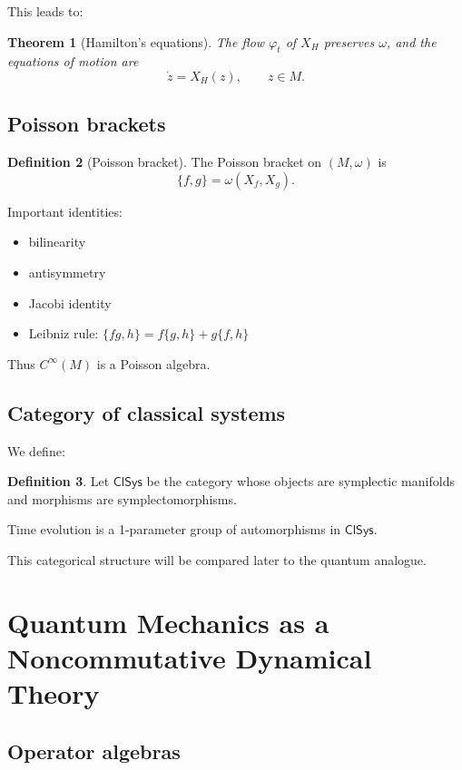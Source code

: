 \documentclass[12pt,oneside]{book}
\theoremstyle{plain}
\newtheorem{theorem}{Theorem}[chapter]
\theoremstyle{definition}
\newtheorem{definition}[theorem]{Definition}
\begin{document}
This leads to:

\begin{theorem}[Hamilton's equations]
The flow $\varphi_t$ of $X_H$ preserves $\omega$, and the equations of motion are
\[
\dot{z} = X_H(z),\qquad z\in M.
\]
\end{theorem}

\subsection{Poisson brackets}

\begin{definition}[Poisson bracket]
The Poisson bracket on $(M,\omega)$ is
\[
\{f,g\} = \omega(X_f, X_g).
\]
\end{definition}

Important identities:

\begin{itemize}
\item bilinearity
\item antisymmetry
\item Jacobi identity
\item Leibniz rule: $\{fg,h\}=f\{g,h\}+g\{f,h\}$
\end{itemize}

Thus $C^\infty(M)$ is a Poisson algebra.

\subsection{Category of classical systems}

We define:

\begin{definition}
Let $\mathsf{ClSys}$ be the category whose objects are symplectic manifolds
and morphisms are symplectomorphisms.
\end{definition}

Time evolution is a 1-parameter group of automorphisms in $\mathsf{ClSys}$.

This categorical structure will be compared later to the quantum analogue.

\section{Quantum Mechanics as a Noncommutative Dynamical Theory}

\subsection{Operator algebras}
\end{document}
